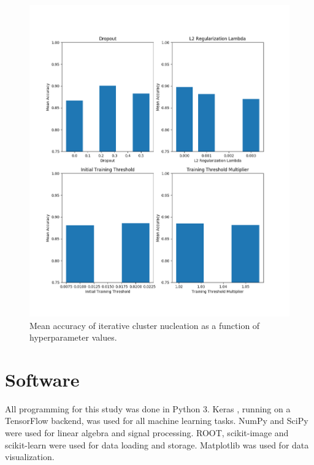 \documentclass[10pt]{article}
\begin{document}
\begin{figure}[h]
    \centering
    \includegraphics[width=\textwidth]{icn_acc_by_hyper}
    \caption{\label{icn_acc_by_hyper} Mean accuracy of iterative cluster nucleation as a function of hyperparameter values.}
\end{figure}

\section{Software}

All programming for this study was done in Python 3. Keras \cite{keras}, running on a TensorFlow backend, was used for all machine learning tasks. NumPy and SciPy were used for linear algebra and signal processing. ROOT, scikit-image and scikit-learn were used for data loading and storage. Matplotlib was used for data visualization.

\printbibliography
\end{document}
